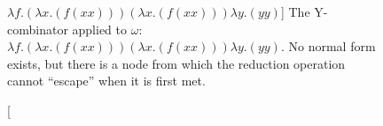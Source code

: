 \begin{figure}[htbp]
	\centering
	
	\caption
	[$\lambda f.(\lambda x.(f (x x))) (\lambda x.(f (x x))) \lambda y.(y y)$]
	{The Y-combinator applied to $\omega$: $\lambda f.(\lambda x.(f (x x))) (\lambda x.(f (x x))) \lambda y.(y y)$.
	No normal form exists, but there is a node from which the reduction operation
	cannot ``escape'' when it is first met.}
	\label{fig:images_Ycomb_2_CIRCO}
\end{figure}
